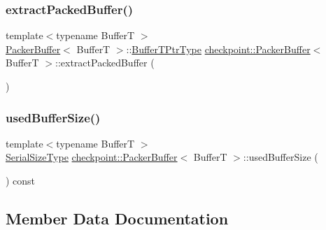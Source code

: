 \mbox{\label{structcheckpoint_1_1_packer_buffer_abc144f3a5d61a7eb886bd57241e7ed7e}} 
\subsubsection{\texorpdfstring{extract\+Packed\+Buffer()}{extractPackedBuffer()}}
{\footnotesize\ttfamily template$<$typename BufferT $>$ \\
\hyperlink{structcheckpoint_1_1_packer_buffer}{Packer\+Buffer}$<$ BufferT $>$\+::\hyperlink{structcheckpoint_1_1_packer_buffer_a081ec628050e8b173e413271fa070c26}{Buffer\+T\+Ptr\+Type} \hyperlink{structcheckpoint_1_1_packer_buffer}{checkpoint\+::\+Packer\+Buffer}$<$ BufferT $>$\+::extract\+Packed\+Buffer (\begin{DoxyParamCaption}{ }\end{DoxyParamCaption})}

\mbox{\label{structcheckpoint_1_1_packer_buffer_a15b3ac40c21710da2f9813579c9a9c0e}} 
\subsubsection{\texorpdfstring{used\+Buffer\+Size()}{usedBufferSize()}}
{\footnotesize\ttfamily template$<$typename BufferT $>$ \\
\hyperlink{namespacecheckpoint_a083f6674da3f94c2901b18c6d238217c}{Serial\+Size\+Type} \hyperlink{structcheckpoint_1_1_packer_buffer}{checkpoint\+::\+Packer\+Buffer}$<$ BufferT $>$\+::used\+Buffer\+Size (\begin{DoxyParamCaption}{ }\end{DoxyParamCaption}) const}



\subsection{Member Data Documentation}
\mbox{\label{structcheckpoint_1_1_packer_buffer_ab07bd403ce6f2e644ff92532f9e363cb}} 
